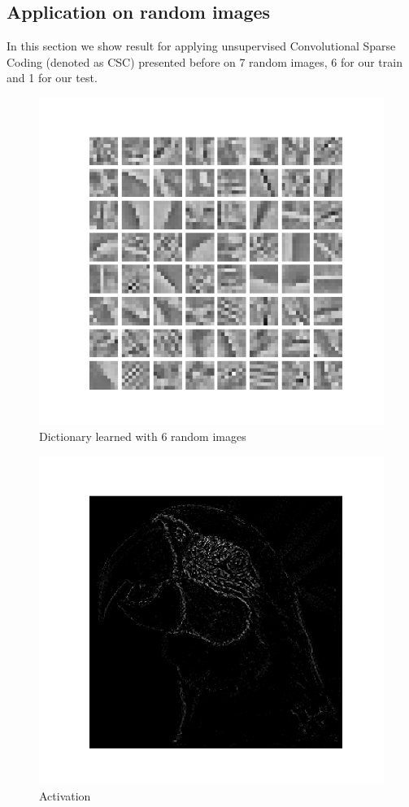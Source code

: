 \subsection{Application on random images}
In this section we show result for applying unsupervised Convolutional Sparse Coding (denoted as CSC) presented before on 7 random images, 6 for our train and 1 for our test.
\begin{figure}[h]
 \centering
 \includegraphics[scale=0.6]{../Results/SPORCO_test_img/Figure_2.png}
 \caption{Dictionary learned with 6 random images}
\end{figure}
\begin{figure}[h]
 \centering
 \includegraphics[scale=0.455]{../Results/SPORCO_test_img/activations.png}
 \caption{Activation}
\end{figure}
